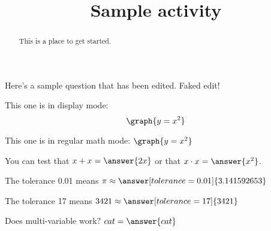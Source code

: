 \documentclass[handout]{ximera}
\title{Sample activity}
\begin{document}
\begin{abstract}
  This is a place to get started.
\end{abstract}


\maketitle

Here's a sample question that has been edited. Faked edit!


This one is in display mode:
\[ \graph{y=x^2} \]

This one is in regular math mode:
\( \graph{y=x^2} \)


\begin{problem}
\begin{multipleChoice}
\end{multipleChoice}
\end{problem}

\begin{problem}
   You can test that $x + x = \answer{2x}$ or that $x \cdot x = \answer{x^2}$.
\end{problem}

\begin{problem}
   The tolerance 0.01 means $\pi \approx \answer[tolerance=0.01]{3.141592653}$
\end{problem}

\begin{problem}
   The tolerance 17 means $3421 \approx \answer[tolerance=17]{3421}$
\end{problem}

\begin{problem}
Does multi-variable work? $ cat = \answer{cat}$
\end{problem}
\end{document}
